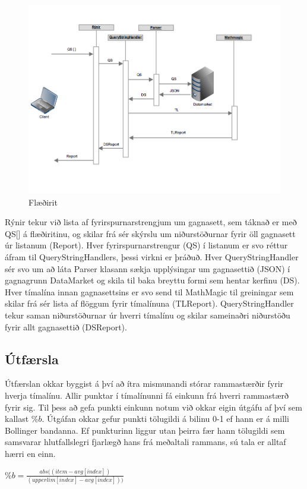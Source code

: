 \documentclass{article}
\begin{document}
\begin{figure}[H]
  \centering
  \includegraphics[width=.75\textwidth]{rynir_sequence-2.png} 
  \caption{Flæðirit} 
\end{figure}

Rýnir tekur við lista af fyrirspurnarstrengjum um gagnasett, sem táknað er með
QS[] á flæðiritinu, og skilar frá sér skýrslu um niðurstöðurnar fyrir öll
gagnasett úr listanum (Report). Hver fyrirspurnarstrengur (QS) í listanum er svo
réttur áfram til QueryStringHandlers, þessi virkni er þráðuð. Hver
QueryStringHandler sér svo um að láta Parser klasann sækja upplýsingar um
gagnasettið (JSON) í gagnagrunn DataMarket og skila til baka breyttu formi sem
hentar kerfinu (DS). Hver tímalína innan gagnasettsins er svo send til MathMagic
til greiningar sem skilar frá sér lista af flöggum fyrir tímalínuna (TLReport).
QueryStringHandler tekur saman niðurstöðurnar úr hverri tímalínu og skilar
sameinaðri niðurstöðu fyrir allt gagnasettið (DSReport).

\subsection{Útfærsla}
\label{sec:imp_our}

Útfærslan okkar byggist á því að ítra mismunandi stórar rammastærðir fyrir
hverja tímalínu.
Allir punktar í tímalínunni fá einkunn frá hverri rammastærð fyrir sig. 
Til þess að gefa punkti einkunn notum við okkar eigin útgáfu af því sem kallast
$\%b$. 
Útgáfan okkar gefur punkti tölugildi á bilinu 0-1 ef hann er á milli Bollinger
bandanna.
Ef punkturinn liggur utan þeirra fær hann tölugildi sem samsvarar hlutfallslegri
fjarlægð hans frá meðaltali rammans, 
sú tala er alltaf hærri en einn.

\begin{center}
  $\%b=\frac{abs((item - avg[index])}{(upperlim[index] - avg[index]))}$
\end{center}
\end{document}
